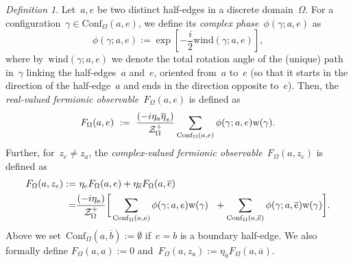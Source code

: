 \documentclass[reqno,11pt,a4paper]{amsart}
\theoremstyle{remark}
\newtheorem{definition}[proposition]{Definition}
\newcommand{\wind}{\mathrm{wind}}
\newcommand{\phase}{\phi}
\newcommand{\weight}{\mathrm{w}}
\newcommand{\F}{F_\Omega}       \newcommand{\Fdelta}{F_{\Omega_\delta}}
\newcommand{\conf}{\mathrm{Conf}}
\newcommand\ConfO[1]{\conf_\Omega(#1)}
\def\cZ{\mathcal Z}
\begin{document}
\begin{definition}
\label{def_fermion}
Let~$a,e$ be two distinct half-edges in a discrete domain~$\Omega$. For a configuration~$\gamma\in\ConfO{a,e}$, we define its \emph{complex phase}~$\phase(\gamma;a,e)$ as
\begin{equation}
\label{eq_phase_def}
\phase(\gamma;a,e) := \exp \left[ -{\textstyle\frac{i}{2}}\wind(\gamma;a,e) \right],
\end{equation}
where by~$\wind(\gamma;a,e)$ we denote the total rotation angle of the (unique) path in~$\gamma$ linking the half-edges~$a$ and~$e$, oriented from~$a$ to~$e$ (so that it starts in the direction of the half-edge~$a$ and ends in the direction opposite to~$e$). Then, the \emph{real-valued fermionic observable}~$\F(a,e)$ is defined as
\begin{equation}
\label{eq_F_real_def}
	\F(a,e)~:=~\frac{{(-i\eta_a{\vphantom{1}}\overline{\eta}_e)}}{\cZ_\Omega^+}\sum_{\ConfO{a,e}}\phase(\gamma;a,e)\weight(\gamma).
\end{equation}
Further, for~$z_e\ne z_a$, the \emph{complex-valued fermionic observable}~$\F(a,z_e)$ is defined as
\begin{align}
\notag
\F(a,z_e):= & ~\eta_e\F(a,e)+\eta_{\overline{e}}\F(a,\overline{e})\\
\label{eq_F_complex_def} = & \frac{{(-i\eta_a)}}{\cZ_\Omega^+}\biggl[\,\sum_{\ConfO{a,e}}\phase(\gamma;a,e)\weight(\gamma)\ \ + \sum_{\ConfO{a,\overline{e}}}\phi(\gamma;a,\overline{e})\weight(\gamma)\biggr].
\end{align}
Above we set~$\ConfO{a,\overline{b}}:=\emptyset$ if~$e=b$ is a boundary half-edge. We also formally define $\F(a,a):=0$ and~$\F(a,z_a):=\eta_{\overline{a}}\F(a,\overline{a})$.
\end{definition}
\end{document}

